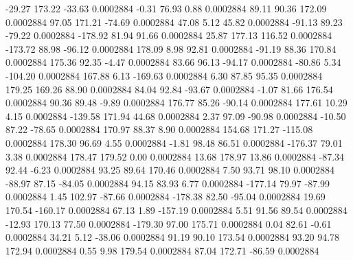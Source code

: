       -29.27      173.22      -33.63     0.0002884
       -0.31       76.93        0.88     0.0002884
       89.11       90.36      172.09     0.0002884
       97.05      171.21      -74.69     0.0002884
       47.08        5.12       45.82     0.0002884
      -91.13       89.23      -79.22     0.0002884
     -178.92       81.94       91.66     0.0002884
       25.87      177.13      116.52     0.0002884
     -173.72       88.98      -96.12     0.0002884
      178.09        8.98       92.81     0.0002884
      -91.19       88.36      170.84     0.0002884
      175.36       92.35       -4.47     0.0002884
       83.66       96.13      -94.17     0.0002884
      -80.86        5.34     -104.20     0.0002884
      167.88        6.13     -169.63     0.0002884
        6.30       87.85       95.35     0.0002884
      179.25      169.26       88.90     0.0002884
       84.04       92.84      -93.67     0.0002884
       -1.07       81.66      176.54     0.0002884
       90.36       89.48       -9.89     0.0002884
      176.77       85.26      -90.14     0.0002884
      177.61       10.29        4.15     0.0002884
     -139.58      171.94       44.68     0.0002884
        2.37       97.09      -90.98     0.0002884
      -10.50       87.22      -78.65     0.0002884
      170.97       88.37        8.90     0.0002884
      154.68      171.27     -115.08     0.0002884
      178.30       96.69        4.55     0.0002884
       -1.81       98.48       86.51     0.0002884
     -176.37       79.01        3.38     0.0002884
      178.47      179.52        0.00     0.0002884
       13.68      178.97       13.86     0.0002884
      -87.34       92.44       -6.23     0.0002884
       93.25       89.64      170.46     0.0002884
        7.50       93.71       98.10     0.0002884
      -88.97       87.15      -84.05     0.0002884
       94.15       83.93        6.77     0.0002884
     -177.14       79.97      -87.99     0.0002884
        1.45      102.97      -87.66     0.0002884
     -178.38       82.50      -95.04     0.0002884
       19.69      170.54     -160.17     0.0002884
       67.13        1.89     -157.19     0.0002884
        5.51       91.56       89.54     0.0002884
      -12.93      170.13       77.50     0.0002884
     -179.30       97.00      175.71     0.0002884
        0.04       82.61       -0.61     0.0002884
       34.21        5.12      -38.06     0.0002884
       91.19       90.10      173.54     0.0002884
       93.20       94.78      172.94     0.0002884
        0.55        9.98      179.54     0.0002884
       87.04      172.71      -86.59     0.0002884
